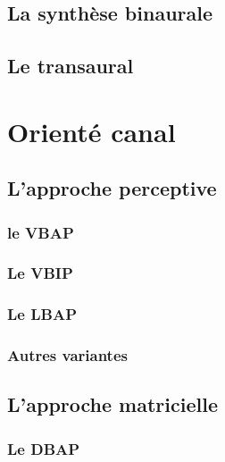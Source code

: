 \documentclass[
  letterpaper,
  DIV=11,
  numbers=noendperiod]{scrreprt}
\begin{document}
\hypertarget{sec-binaural-synthese}{%
\section{La synthèse binaurale}\label{sec-binaural-synthese}}

\hypertarget{sec-transaural}{%
\section{Le transaural}\label{sec-transaural}}

\hypertarget{orientuxe9-canal}{%
\chapter{Orienté canal}\label{orientuxe9-canal}}

\hypertarget{lapproche-perceptive}{%
\section{L'approche perceptive}\label{lapproche-perceptive}}

\hypertarget{sec-vbap}{%
\subsection{le VBAP}\label{sec-vbap}}

\hypertarget{le-vbip}{%
\subsection{Le VBIP}\label{le-vbip}}

\hypertarget{sec-lbap}{%
\subsection{Le LBAP}\label{sec-lbap}}

\hypertarget{autres-variantes}{%
\subsection{Autres variantes}\label{autres-variantes}}

\hypertarget{lapproche-matricielle}{%
\section{L'approche matricielle}\label{lapproche-matricielle}}

\hypertarget{le-dbap}{%
\subsection{Le DBAP}\label{le-dbap}}
\end{document}

